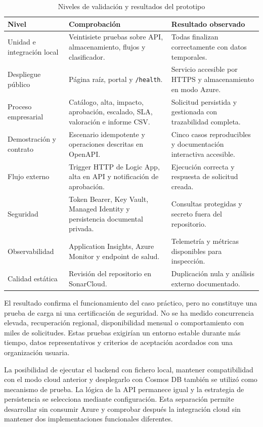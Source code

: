 \begin{table}[ht]
\centering
\small
\begin{tabularx}{\textwidth}{l X X}
\textbf{Nivel} & \textbf{Comprobación} & \textbf{Resultado observado} \\
\hline
Unidad e integración local & Veintisiete pruebas sobre API, almacenamiento, flujos y clasificador. & Todas finalizan correctamente con datos temporales. \\
Despliegue público & Página raíz, portal y \texttt{/health}. & Servicio accesible por HTTPS y almacenamiento en modo Azure. \\
Proceso empresarial & Catálogo, alta, impacto, aprobación, escalado, SLA, valoración e informe CSV. & Solicitud persistida y gestionada con trazabilidad completa. \\
Demostración y contrato & Escenario idempotente y operaciones descritas en OpenAPI. & Cinco casos reproducibles y documentación interactiva accesible. \\
Flujo externo & Trigger HTTP de Logic App, alta en API y notificación de aprobación. & Ejecución correcta y respuesta de solicitud creada. \\
Seguridad & Token Bearer, Key Vault, Managed Identity y persistencia documental privada. & Consultas protegidas y secreto fuera del repositorio. \\
Observabilidad & Application Insights, Azure Monitor y endpoint de salud. & Telemetría y métricas disponibles para inspección. \\
Calidad estática & Revisión del repositorio en SonarCloud. & Duplicación nula y análisis externo documentado. \\
\end{tabularx}
\caption{Niveles de validación y resultados del prototipo}
\label{tabla:validacion-resultados}
\end{table}

El resultado confirma el funcionamiento del caso práctico, pero no constituye una prueba de carga ni una certificación de seguridad. No se ha medido concurrencia elevada, recuperación regional, disponibilidad mensual o comportamiento con miles de solicitudes. Estas pruebas exigirían un entorno estable durante más tiempo, datos representativos y criterios de aceptación acordados con una organización usuaria.

La posibilidad de ejecutar el backend con fichero local, mantener compatibilidad con el modo cloud anterior y desplegarlo con Cosmos DB también se utilizó como mecanismo de prueba. La lógica de la API permanece igual y la estrategia de persistencia se selecciona mediante configuración. Esta separación permite desarrollar sin consumir Azure y comprobar después la integración cloud sin mantener dos implementaciones funcionales diferentes.
